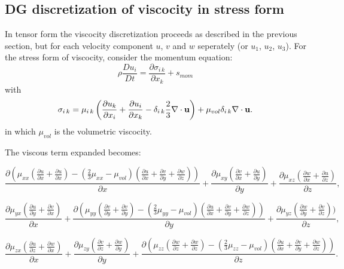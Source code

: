 \subsection{DG discretization of viscocity in stress form}
In tensor form the viscocity discretization proceeds as described in the
previous section, but for each velocity component $u$, $v$ and $w$ seperately (or $u_1$, $u_2$, $u_3$).
For the stress form of viscocity, consider the momentum equation:
\begin{equation}
\rho \frac{ D u_i}{D t} = \frac{\partial \sigma_{i\,k}}{\partial x_k} +s_{mom}
\end{equation}
with
\begin{equation}
\sigma_{i\, k}=\mu_{i\, k} \left(
\frac{\partial u_k}{\partial x_i} +  \frac{\partial u_i}{\partial x_k}
-\delta_{i\, k} \frac{2}{3} \nabla\cdot {\bf u} \right)  +  \mu_{vol} \delta_{i\, k} \nabla\cdot {\bf u}.
\end{equation}
in which $\mu_{vol} $ is the volumetric viscocity.

The viscous term expanded becomes:

\begin{equation}
\frac{\partial ( \mu_{xx}
(
\frac{\partial u}{\partial x}+\frac{\partial u}{\partial x})
-(\frac{2}{3}\mu_{xx}-\mu_{vol})(\frac{\partial u}{\partial x}+\frac{\partial v}{\partial y}+\frac{\partial w}{\partial z})
)}
{\partial x}
+
\frac{\partial \mu_{xy}
(
\frac{\partial v}{\partial x}+\frac{\partial u}{\partial y})
}
{\partial y}
+
\frac{\partial \mu_{xz}
(
\frac{\partial w}{\partial x}+\frac{\partial u}{\partial z})
}
{\partial z},
\label{visc-stress-u}
\end{equation}



\begin{equation}
\frac{\partial \mu_{yx}
(
\frac{\partial u}{\partial y}+\frac{\partial v}{\partial x}
)}
{\partial x}
+
\frac{\partial (\mu_{yy}
(
\frac{\partial v}{\partial y}+\frac{\partial v}{\partial y})
-(\frac{2}{3}\mu_{yy}-\mu_{vol})(\frac{\partial u}{\partial x}+\frac{\partial v}{\partial y}+\frac{\partial w}{\partial z})
)}
{\partial y}
+
\frac{\partial \mu_{yz}
(
\frac{\partial w}{\partial y}+\frac{\partial v}{\partial z})
)}
{\partial z},
\label{visc-stress-v}
\end{equation}



\begin{equation}
\frac{\partial \mu_{zx}
(
\frac{\partial u}{\partial z}+\frac{\partial w}{\partial x})
}
{\partial x}
+
\frac{\partial \mu_{zy}
(
\frac{\partial v}{\partial z}+\frac{\partial w}{\partial y})
}
{\partial y}
+
\frac{\partial ( \mu_{zz}
(
\frac{\partial w}{\partial z}+\frac{\partial w}{\partial z})
-(\frac{2}{3}\mu_{zz}-\mu_{vol})(\frac{\partial u}{\partial x}+\frac{\partial v}{\partial y}+\frac{\partial w}{\partial z})
)}
{\partial z}.
\label{visc-stress-w}
\end{equation}


